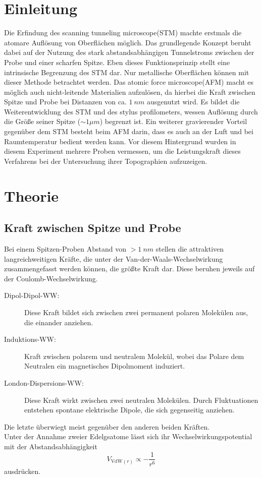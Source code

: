 \section*{Einleitung}
Die Erfindung des \glqq scanning tunneling microscope\grqq (STM) machte erstmals die atomare Auflösung von Oberflächen möglich.
Das grundlegende Konzept beruht dabei auf der Nutzung des stark abstandsabhängigen Tunnelstroms zwischen der Probe und einer scharfen Spitze.
Eben dieses Funktionsprinzip stellt eine intrinsische Begrenzung des STM dar.
Nur metallische Oberflächen können mit dieser Methode betrachtet werden.
Das \glqq atomic force microscope\grqq (AFM) macht es möglich auch nicht-leitende Materialien aufzulösen, da hierbei die Kraft zwischen Spitze und Probe bei Distanzen von ca. $\SI{1}{nm}$ ausgenutzt wird.
Es bildet die Weiterentwicklung des STM und des stylus profilometers, wessen Auflösung durch die Größe seiner Spitze ($\sim 1\mu m$) begrenzt ist.
Ein weiterer gravierender Vorteil gegenüber dem STM besteht beim AFM darin, dass es auch an der Luft und bei Raumtemperatur bedient werden kann.
Vor diesem Hintergrund wurden in diesem Experiment mehrere Proben vermessen, um die Leistungskraft dieses Verfahrens bei der Untersuchung ihrer Topographien aufzuzeigen.

\section{Theorie}
\subsection{Kraft zwischen Spitze und Probe}
    Bei einem Spitzen-Proben Abstand von $> \SI{1}{nm}$ stellen die attraktiven langreichweitigen Kräfte, die unter der Van-der-Waals-Wechselwirkung zusammengefasst werden können, die größte Kraft dar. Diese beruhen jeweils auf der Coulomb-Wechselwirkung.
    \hspace{3cm}
    \begin{description}
        \item[Dipol-Dipol-WW:]  Diese Kraft bildet sich zwischen zwei permanent polaren Molekülen aus, die einander anziehen.
        \item[Induktions-WW:]  Kraft zwischen polarem und neutralem Molekül, wobei das Polare dem Neutralen ein magnetisches Dipolmoment induziert.
        \item[London-Dispersions-WW:]  Diese Kraft wirkt zwischen zwei neutralen Molekülen. Durch Fluktuationen entstehen spontane elektrische Dipole, die sich gegenseitig anziehen.
    \end{description}
    Die letzte überwiegt meist gegenüber den anderen beiden Kräften. \\
    Unter der Annahme zweier Edelgsatome lässt sich ihr Wechselwirkungspotential mit der Abstandsabhängigkeit
    \begin{equation*}
        V_{\mathrm{VdW}(r)} \propto -\frac{1}{r^6}
    \end{equation*}
    ausdrücken.

